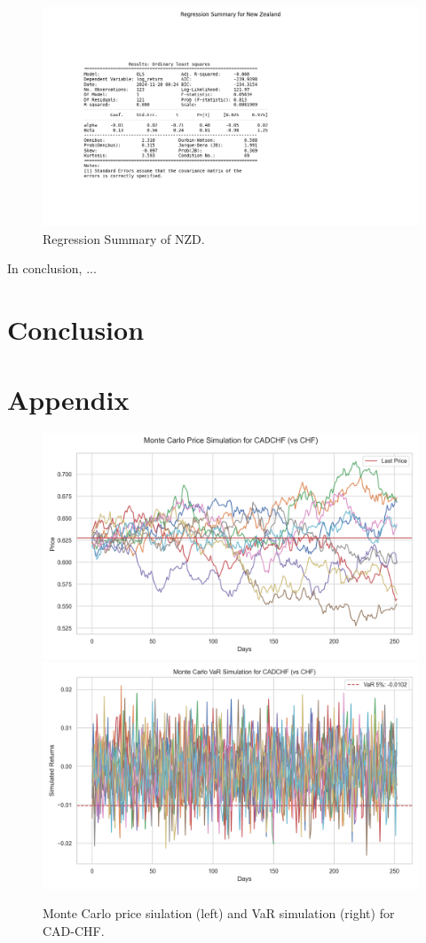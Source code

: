 \documentclass{article}
\begin{document}
\begin{figure}[h]
    \centering  \includegraphics[width=0.75\linewidth]{reports/figures/regression_summary_New Zealand.png}
    \caption{Regression Summary of NZD.}
    \label{fig:regression_summary_New Zealand}
\end{figure}

In conclusion, ...

\section{Conclusion}
\section*{Appendix}

\begin{figure}[h]
    \centering  \includegraphics[width=0.48\linewidth]{reports/figures/monte_carlo_price_simulation_CADCHF_vs_CHF.png} \label{fig:monte_carlo_price_simulation_CADCHF_vs_CHF}
    \includegraphics[width=0.48\linewidth]{reports/figures/monte_carlo_var_simulation_CADCHF_vs_CHF.png} \label{fig:monte_carlo_var_simulation_CADCHF_vs_CHF}
    \caption{\footnotesize Monte Carlo price siulation (left) and VaR simulation (right) for CAD-CHF.}
\end{figure}
\printbibliography
\end{document}
